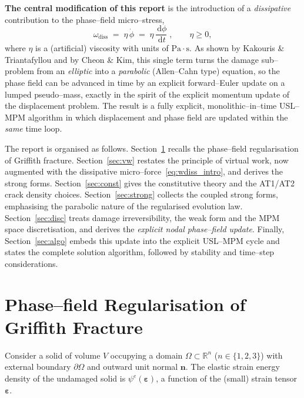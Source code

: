 \documentclass[12pt,a4paper]{article}
\newcommand{\eng}[1]{#1}
\newcommand{\beps}{\boldsymbol{\varepsilon}}
\newcommand{\bn}{\mathbf{n}}
\newcommand{\dd}{\,\mathrm{d}}
\begin{document}
	\textbf{The central modification of this report} is the introduction of a
	\emph{dissipative} contribution to the phase--field micro--stress,
	\begin{equation}\label{eq:wdiss_intro}
		\boxed{\;\omega_{\mathrm{diss}} \;=\; \eta\,\dot{\phi} \;=\; \eta\,\frac{\dd\phi}{\dd t}\;,\qquad \eta\ge 0,\;}
	\end{equation}
	where $\eta$ is a (artificial) viscosity with units of
	$\mathrm{Pa\cdot s}$. As shown by Kakouris \& Triantafyllou and by Cheon \&
	Kim, this single term turns the damage sub--problem from an \emph{elliptic}
	into a \emph{parabolic} (Allen--Cahn type) equation, so the phase field can be
	advanced in time by an explicit forward--Euler update on a lumped pseudo--mass,
	exactly in the spirit of the explicit momentum update of the displacement
	problem. The result is a fully explicit, monolithic--in--time
	\eng{USL--MPM} algorithm in which displacement and phase field are updated
	within the \emph{same} time loop.

	The report is organised as follows. Section~\ref{sec:reg} recalls the
	phase--field regularisation of Griffith fracture. Section~\ref{sec:vw} restates
	the principle of virtual work, now augmented with the dissipative
	micro--force~\eqref{eq:wdiss_intro}, and derives the strong forms.
	Section~\ref{sec:const} gives the constitutive theory and the AT1/AT2 crack
	density choices. Section~\ref{sec:strong} collects the coupled strong forms,
	emphasising the parabolic nature of the regularised evolution law.
	Section~\ref{sec:disc} treats damage irreversibility, the weak form and the
	MPM space discretisation, and derives the \emph{explicit nodal phase--field
	update}. Finally, Section~\ref{sec:algo} embeds this update into the explicit
	\eng{USL--MPM} cycle and states the complete solution algorithm, followed by
	stability and time--step considerations.

	\section{Phase--field Regularisation of Griffith Fracture}\label{sec:reg}

	Consider a solid of volume $V$ occupying a domain $\Omega\subset\mathbb{R}^n$
	($n\in\{1,2,3\}$) with external boundary $\partial\Omega$ and outward unit
	normal $\bn$. The elastic strain energy density of the undamaged solid is
	$\psi^e(\beps)$, a function of the (small) strain tensor $\beps$.
\end{document}
